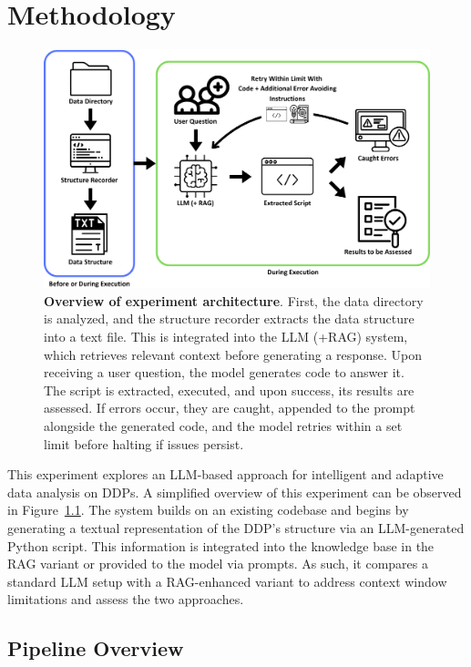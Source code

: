 \documentclass{DESSThesis}
\begin{document}
\chapter{Methodology} \label{chap:methodology}

\begin{figure}[!b]
    \centering
    \includegraphics[width=0.85\linewidth]{img/Methodology/Experiment Workflow.png}
    \caption[Overview of experiment architecture]{\textbf{Overview of experiment architecture}. 
    First, the data directory is analyzed, and the structure recorder extracts the data structure into a text file. This is integrated into the LLM (+RAG) system, which retrieves relevant context before generating a response. Upon receiving a user question, the model generates code to answer it. The script is extracted, executed, and upon success, its results are assessed. If errors occur, they are caught, appended to the prompt alongside the generated code, and the model retries within a set limit before halting if issues persist.}
    \label{fig:experiment_architecture}
\end{figure}

This experiment explores an LLM-based approach for intelligent and adaptive data analysis on DDPs. A simplified overview of this experiment can be observed in Figure~\ref{fig:experiment_architecture}. The system builds on an existing codebase and begins by generating a textual representation of the DDP's structure via an LLM-generated Python script. This information is integrated into the knowledge base in the RAG variant or provided to the model via prompts. As such, it compares a standard LLM setup with a RAG-enhanced variant to address context window limitations and assess the two approaches.

\section{Pipeline Overview}
\end{document}

